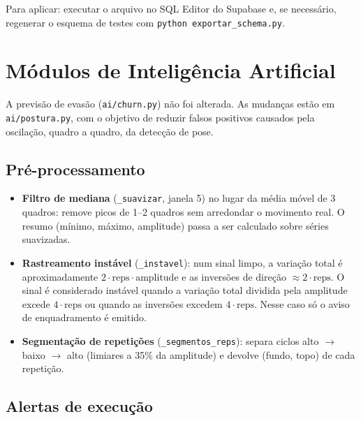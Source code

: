 \documentclass[11pt,a4paper]{article}
\newcommand{\cod}[1]{\texttt{#1}}
\begin{document}
Para aplicar: executar o arquivo no SQL Editor do Supabase e, se necessário, regenerar o esquema
de testes com \cod{python exportar\_schema.py}.

\section{Módulos de Inteligência Artificial}

A previsão de evasão (\cod{ai/churn.py}) não foi alterada. As mudanças estão em
\cod{ai/postura.py}, com o objetivo de reduzir falsos positivos causados pela oscilação, quadro a
quadro, da detecção de pose.

\subsection{Pré-processamento}

\begin{itemize}
  \item \textbf{Filtro de mediana} (\cod{\_suavizar}, janela 5) no lugar da média móvel de 3 quadros:
        remove picos de 1--2 quadros sem arredondar o movimento real. O resumo
        (mínimo, máximo, amplitude) passa a ser calculado sobre séries suavizadas.
  \item \textbf{Rastreamento instável} (\cod{\_instavel}): num sinal limpo, a variação total é
        aproximadamente $2\cdot\text{reps}\cdot\text{amplitude}$ e as inversões de direção
        $\approx 2\cdot\text{reps}$. O sinal é considerado instável quando a variação total
        dividida pela amplitude excede $4\cdot\text{reps}$ ou quando as inversões excedem
        $4\cdot\text{reps}$. Nesse caso só o aviso de enquadramento é emitido.
  \item \textbf{Segmentação de repetições} (\cod{\_segmentos\_reps}): separa ciclos
        alto $\rightarrow$ baixo $\rightarrow$ alto (limiares a 35\% da amplitude) e devolve
        (fundo, topo) de cada repetição.
\end{itemize}

\subsection{Alertas de execução}
\end{document}
